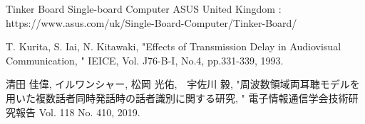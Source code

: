\begin{thebibliography}{99}
Tinker Board Single-board Computer ASUS United Kingdom : https://www.asus.com/uk/Single-Board-Computer/Tinker-Board/

T. Kurita, S. Iai, N. Kitawaki, "Effects of Transmission Delay in Audiovisual Communication, " IEICE, Vol. J76-B-I, No.4, pp.331-339, 1993.

清田 佳偉, イルワンシャー, 松岡 光佑,　宇佐川 毅, "周波数領域両耳聴モデルを用いた複数話者同時発話時の話者識別に関する研究, " 電子情報通信学会技術研究報告 Vol. 118 No. 410, 2019.

\end{thebibliography}


